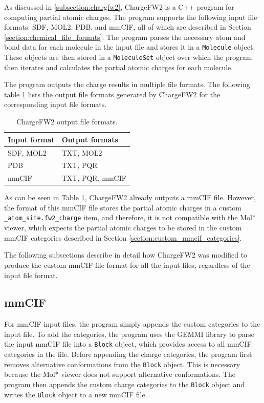 \documentclass[
  digital,     %
  oneside,     %
  nosansbold,  %
  nocolorbold, %
  lof,         %
  lot,         %
]{fithesis4}
\begin{document}
As discussed in \ref{subsection:chargfw2}, ChargeFW2 is a C++ program for computing partial atomic charges. The program supports the following input file formats: SDF, MOL2, PDB, and mmCIF, all of which are described in Section \ref{section:chemical_file_formats}. The program parses the necessary atom and bond data for each molecule in the input file and stores it in a \texttt{Molecule} object. These objects are then stored in a \texttt{MoleculeSet} object over which the program then iterates and calculates the partial atomic charges for each molecule.

The program outputs the charge results in multiple file formats. The following table \ref{table:chargefw2_output_formats} lists the output file formats generated by ChargeFW2 for the corresponding input file formats.

\begin{table}[htbp]
  \centering
  \begin{tabular}{|l|l|}
    \hline
    \textbf{Input format} & \textbf{Output formats} \\
    \hline
    SDF, MOL2 & TXT, MOL2 \\
    \hline
    PDB & TXT, PQR \\
    \hline
    mmCIF & TXT, PQR, mmCIF \\
    \hline
  \end{tabular}
  \caption{ChargeFW2 output file formats.}
  \label{table:chargefw2_output_formats}
\end{table}

As can be seen in Table \ref{table:chargefw2_output_formats}, ChargeFW2 already outputs a mmCIF file. However, the format of this mmCIF file stores the partial atomic charges in a custom \texttt{\_atom\_site.fw2\_charge} item, and therefore, it is not compatible with the Mol* viewer, which expects the partial atomic charges to be stored in the custom mmCIF categories described in Section \ref{section:custom_mmcif_categories}.

The following subsections describe in detail how ChargeFW2 was modified to produce the custom mmCIF file format for all the input files, regardless of the input file format.

\subsection*{mmCIF}

For mmCIF input files, the program simply appends the custom categories to the input file. To add the categories, the program uses the GEMMI library \cite{wojdyr2022gemmi} to parse the input mmCIF file into a \texttt{Block} object, which provides access to all mmCIF categories in the file. Before appending the charge categories, the program first removes alternative conformations from the \texttt{Block} object. This is necessary because the Mol* viewer does not support alternative conformations. The program then appends the custom charge categories to the \texttt{Block} object and writes the \texttt{Block} object to a new mmCIF file.
\end{document}

